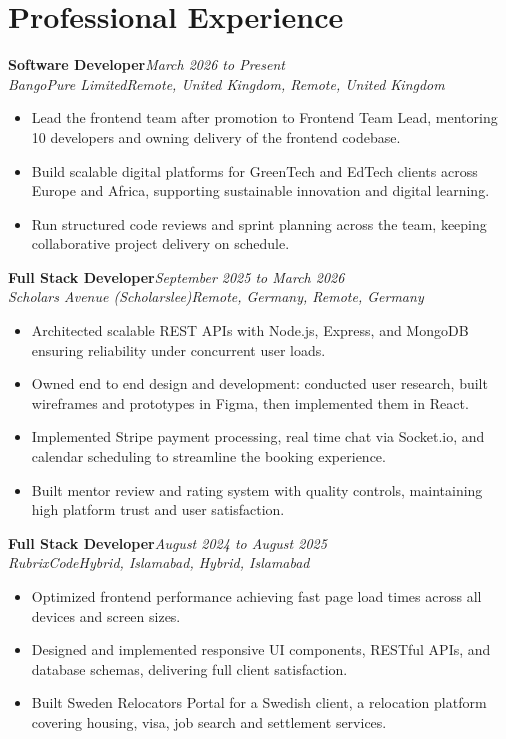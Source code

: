 \documentclass[11pt,letterpaper]{article}
\newcommand{\entry}[4]{%
  \textbf{#1}\hfill\textit{#2}\\
  \textit{#3\ifx\relax#4\relax\else, #4\fi}\\[0.14em]}
\begin{document}
\section{Professional Experience}
\entry{Software Developer}{March 2026 to Present}{BangoPure Limited}{Remote, United Kingdom}
\begin{itemize}
  \item Lead the frontend team after promotion to Frontend Team Lead, mentoring 10 developers and owning delivery of the frontend codebase.
  \item Build scalable digital platforms for GreenTech and EdTech clients across Europe and Africa, supporting sustainable innovation and digital learning.
  \item Run structured code reviews and sprint planning across the team, keeping collaborative project delivery on schedule.
\end{itemize}\vspace{0.4em}
\entry{Full Stack Developer}{September 2025 to March 2026}{Scholars Avenue (Scholarslee)}{Remote, Germany}
\begin{itemize}
  \item Architected scalable REST APIs with Node.js, Express, and MongoDB ensuring reliability under concurrent user loads.
  \item Owned end to end design and development: conducted user research, built wireframes and prototypes in Figma, then implemented them in React.
  \item Implemented Stripe payment processing, real time chat via Socket.io, and calendar scheduling to streamline the booking experience.
  \item Built mentor review and rating system with quality controls, maintaining high platform trust and user satisfaction.
\end{itemize}\vspace{0.4em}
\entry{Full Stack Developer}{August 2024 to August 2025}{RubrixCode}{Hybrid, Islamabad}
\begin{itemize}
  \item Optimized frontend performance achieving fast page load times across all devices and screen sizes.
  \item Designed and implemented responsive UI components, RESTful APIs, and database schemas, delivering full client satisfaction.
  \item Built Sweden Relocators Portal for a Swedish client, a relocation platform covering housing, visa, job search and settlement services.
\end{itemize}
\end{document}
